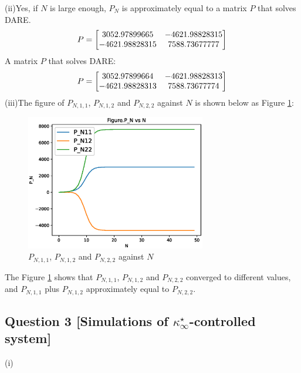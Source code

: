 \documentclass[a4paper,11pt,reqno]{amsart}
\begin{document}
(ii)Yes, if $N$ is large enough, $P_N$ is approximately equal to a matrix $P$ that solves DARE.
\begin{equation}
    P =
    \begin{bmatrix}
        3052.97899665 & -4621.98828315 \\
        -4621.98828315 & 7588.73677777
    \end{bmatrix}
    \notag
\end{equation}
A matrix $P$ that solves DARE:
\begin{equation}
    P =
    \begin{bmatrix}
        3052.97899664 & -4621.98828313 \\
        -4621.98828313 & 7588.73677774
    \end{bmatrix}
    \notag
\end{equation}
(iii)The figure of $P_{N,1,1}$, $P_{N,1,2}$ and $P_{N,2,2}$ against $N$ is shown below as Figure \ref{fig:q2_iii}:
\begin{figure}[H]
    \centering
    \includegraphics[width=0.7\textwidth]{figures/q2_iii.eps}
    \caption{$P_{N,1,1}$, $P_{N,1,2}$ and $P_{N,2,2}$ against $N$}
    \label{fig:q2_iii}
\end{figure}
The Figure \ref{fig:q2_iii} shows that $P_{N,1,1}$, $P_{N,1,2}$ and $P_{N,2,2}$ converged to different values, and $P_{N,1,1}$ plus $P_{N,1,2}$ approximately equal to $P_{N,2,2}$.

\subsection*{Question 3 [Simulations of \texorpdfstring{$\kappa ^{\star}_{\infty}$}{Lg}-controlled system]}\label{sec:q3}
(i)
\end{document}
